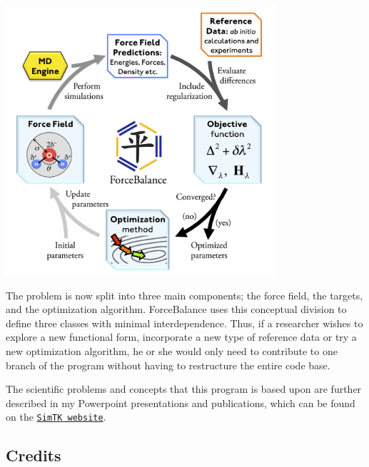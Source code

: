  
\begin{DoxyImage}
\includegraphics[height=10cm]{cycle.png}
\end{DoxyImage}


The problem is now split into three main components; the force field, the targets, and the optimization algorithm. Force\+Balance uses this conceptual division to define three classes with minimal interdependence. Thus, if a researcher wishes to explore a new functional form, incorporate a new type of reference data or try a new optimization algorithm, he or she would only need to contribute to one branch of the program without having to restructure the entire code base.

The scientific problems and concepts that this program is based upon are further described in my Powerpoint presentations and publications, which can be found on the \href{https://simtk.org/home/forcebalance/}{\tt Sim\+TK website}.\hypertarget{index_credits}{}\subsection{Credits}\label{index_credits}

